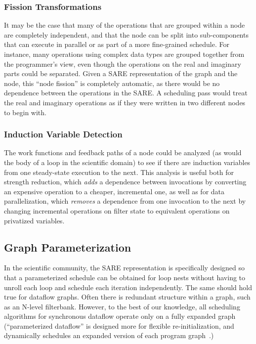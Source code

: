 \subsubsection{Fission Transformations}

It may be the case that many of the operations that are grouped within
a node are completely independent, and that the node can be split into
sub-components that can execute in parallel or as part of a more
fine-grained schedule.  For instance, many operations using complex
data types are grouped together from the programmer's view, even
though the operations on the real and imaginary parts could be
separated.  Given a SARE representation of the graph and the node,
this ``node fission'' is completely automatic, as there would be no
dependence between the operations in the SARE.  A scheduling pass
would treat the real and imaginary operations as if they were written
in two different nodes to begin with.

\subsubsection{Induction Variable Detection}

The work functions and feedback paths of a node could be analyzed (as
would the body of a loop in the scientific domain) to see if there are
induction variables from one steady-state execution to the next.  This
analysis is useful both for strength reduction, which {\it adds} a
dependence between invocations by converting an expensive operation to
a cheaper, incremental one, as well as for data parallelization, which
{\it removes} a dependence from one invocation to the next by changing
incremental operations on filter state to equivalent operations on
privatized variables.

\subsection{Graph Parameterization}

In the scientific community, the SARE representation is specifically
designed so that a parameterized schedule can be obtained for loop
nests without having to unroll each loop and schedule each iteration
independently.  The same should hold true for dataflow graphs.  Often
there is redundant structure within a graph, such as an N-level
filterbank.  However, to the best of our knowledge, all scheduling
algorithms for synchronous dataflow operate only on a fully expanded
graph (``parameterized dataflow'' is designed more for flexible
re-initialization, and dynamically schedules an expanded version of
each program graph~\cite{Bhatt00}.)

